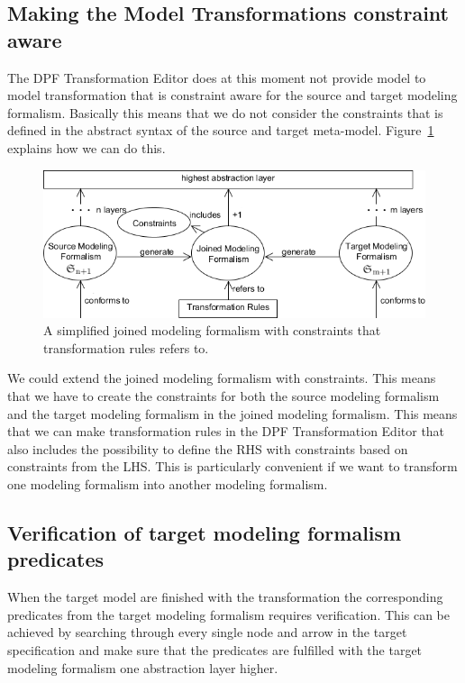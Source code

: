 \subsection{Making the Model Transformations constraint aware}

The DPF Transformation Editor does at this moment not provide model to model
transformation that is constraint aware for the source and target modeling
formalism. Basically this means that we do not consider the constraints that is
defined in the abstract syntax of the source and target meta-model.
Figure~\ref{fig:simple_modeling_formalism_constraints} explains how we can do
this.

\begin{figure}[H]
	\centering
	\includegraphics[scale=0.7]{./Figures/simple_modeling_formalism_constraints.png}
	\caption[Simplified joined specification]
	{A simplified joined modeling formalism with constraints that transformation
	rules refers to.}
	\label{fig:simple_modeling_formalism_constraints}
\end{figure}

We could extend the joined modeling formalism with constraints. This means that
we have to create the constraints for both the source modeling formalism and the
target modeling formalism in the joined modeling formalism. This means that we
can make transformation rules in the DPF Transformation Editor that also
includes the possibility to define the RHS with constraints based on constraints
from the LHS. This is particularly convenient if we want to transform one
modeling formalism into another modeling formalism. 

\subsection{Verification of target modeling formalism predicates}

When the target model are finished with the transformation the corresponding
predicates from the target modeling formalism requires verification. This can be
achieved by searching through every single node and arrow in the target
specification and make sure that the predicates are fulfilled with the target
modeling formalism one abstraction layer higher. 





